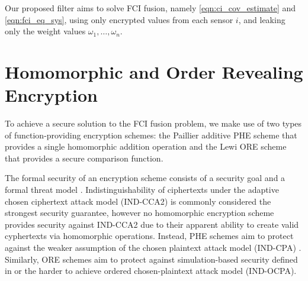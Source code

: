 \documentclass[letterpaper, 10 pt, journal, twoside]{ieeetran}  %
\begin{document}
Our proposed filter aims to solve FCI fusion, namely \eqref{eqn:ci_cov_estimate} and \eqref{eqn:fci_eq_sys}, using only encrypted values from each sensor $i$, and leaking only the weight values $\omega_1,\dots,\omega_n$.




\section{Homomorphic and Order Revealing Encryption} \label{sec:encryption}
To achieve a secure solution to the FCI fusion problem, we make use of two types of function-providing encryption schemes: the Paillier additive PHE scheme \cite{paillierPublicKeyCryptosystemsBased1999} that provides a single homomorphic addition operation and the Lewi ORE scheme \cite{lewiOrderRevealingEncryptionNew2016} that provides a secure comparison function.

The formal security of an encryption scheme consists of a security goal and a formal threat model \cite{katzIntroductionModernCryptography2008}. Indistinguishability of ciphertexts under the adaptive chosen ciphertext attack model (IND-CCA2) is commonly considered the strongest security guarantee, however no homomorphic encryption scheme provides security against IND-CCA2 due to their apparent ability to create valid cyphertexts via homomorphic operations. Instead, PHE schemes aim to protect against the weaker assumption of the chosen plaintext attack model (IND-CPA) \cite{chaseSecurityHomomorphicEncryption2017}. Similarly, ORE schemes aim to protect against simulation-based security defined in \cite{chenettePracticalOrderRevealingEncryption2016} or the harder to achieve ordered chosen-plaintext attack model (IND-OCPA).
\end{document}
